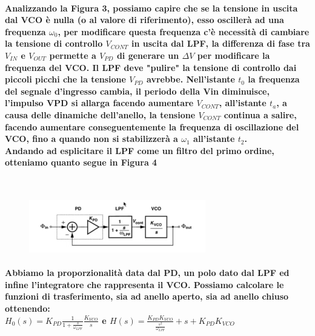 \documentclass{article}
\begin{document}
\paragraph{Analizzando la Figura 3, possiamo capire che se la tensione in uscita dal VCO è nulla (o al valore di riferimento), esso oscillerà ad una frequenza $\omega _{0}$, per modificare questa frequenza c'è necessità di cambiare la tensione di controllo $V_{CONT}$ in uscita dal LPF, la differenza di fase tra $V_{IN}$ e $V_{OUT}$ permette a $V_{PD}$ di generare un $\Delta V$ per modificare la frequenza del VCO. Il LPF deve "pulire" la tensione di controllo dai piccoli picchi che la tensione $V_{PD}$ avrebbe. 
Nell'istante $t_{0}$ la frequenza del segnale d'ingresso cambia, il periodo della Vin diminuisce, l'impulso VPD si allarga facendo aumentare $V_{CONT}$, all'istante $t_{a}$, a causa delle dinamiche dell'anello, la tensione $V_{CONT}$ continua a salire, facendo aumentare conseguentemente la frequenza di oscillazione del VCO, fino a quando non si stabilizzerà a $\omega _{1}$ all'istante $t_{2}$.\\Andando ad esplicitare il LPF come un filtro del primo ordine, otteniamo quanto segue in Figura 4}
~\begin{figure}[!h]%
\includegraphics[scale=1.5]{Esplicitato.png} 
\caption{}
\label{fig:foo}
\end{figure}
\paragraph{Abbiamo la proporzionalità data dal PD, un polo dato dal LPF ed infine l'integratore che rappresenta il VCO. Possiamo calcolare le funzioni di trasferimento, sia ad anello aperto, sia ad anello chiuso ottenendo:\\$H_{0}(s)=K_{PD}\frac{1}{1+\frac{s}{\omega _{LPF}}}\frac{K_{VCO}}{s}$   e   $H(s)=\frac{K_{PD}K_{VCO}}{\frac{s^{2}}{\omega_{LPF}}}+s+K_{PD}K_{VCO}$}
\end{document}

